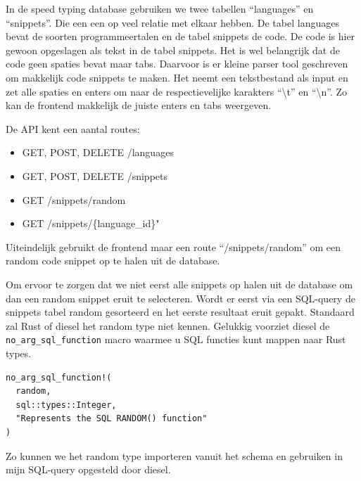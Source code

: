 In de speed typing database gebruiken we twee tabellen “languages” en “snippets”. Die een een op
veel relatie met elkaar hebben. De tabel languages bevat de soorten programmeertalen en de tabel
snippets de code. De code is hier gewoon opgeslagen als tekst in de tabel snippets. Het is wel
belangrijk dat de code geen spaties bevat maar tabs. Daarvoor is er kleine parser tool geschreven om
makkelijk code snippets te maken. Het neemt een tekstbestand als input en zet alle spaties en enters
om naar de respectievelijke karakters “\textbackslash t” en “\textbackslash n”. Zo kan de frontend
makkelijk de juiste enters en tabs weergeven. 

De API kent een aantal routes:
\begin{itemize}
    \item GET, POST, DELETE  /languages
    \item GET, POST, DELETE /snippets 
    \item GET /snippets/random 
    \item GET /snippets/\{language\_id\}"
\end{itemize}

Uiteindelijk gebruikt de frontend maar een route “/snippets/random” om een random code snippet op te
halen uit de database. 

Om ervoor te zorgen dat we niet eerst alle snippets op halen uit de database om dan een random
snippet eruit te selecteren. Wordt er eerst via een SQL-query de snippets tabel random gesorteerd en
het eerste resultaat eruit gepakt. Standaard zal Rust of diesel het random type niet kennen.
Gelukkig voorziet diesel de \texttt{no_arg_sql_function} macro waarmee u SQL functies
kunt mappen naar Rust types.

\begin{listing}[h]
\begin{verbatim}
no_arg_sql_function!(
  random,
  sql::types::Integer,
  "Represents the SQL RANDOM() function"
)
\end{verbatim}
\end{listing}

Zo kunnen we het random type importeren vanuit het schema en gebruiken in mijn SQL-query opgesteld
door diesel.
